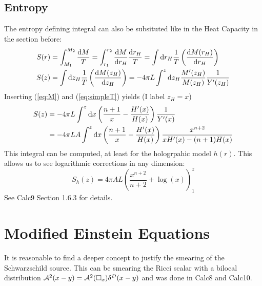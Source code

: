\documentclass[10pt,a4paper, fleqn]{article}
\begin{document}
\subsection{Entropy}
%
The entropy defining integral can also be subsituted like in the Heat Capacity in the section before:
%
\begin{subequations}
\begin{align}
S(r) &= \int^{M_2}_{M_1} \frac{\mathrm{d} M}T = \int_{r_1}^{r_2} \frac{\mathrm{d} M}{\mathrm{d} r_H} \frac {\mathrm{d} r_H}T = \int \mathrm{d} r_H \frac 1T \left( \frac{\mathrm{d} M(r_H)}{\mathrm{d} r_H} \right) \\
S(z) &= \int \mathrm{d} z_H \frac 1T \left( \frac{\mathrm{d} M(z_H)}{\mathrm{d} z_H} \right)
=  -4\pi L \int^z \mathrm{d} z_H\frac{M'(z_H)}{M(z_H)} \frac  1{Y'(z_H)} 
\end{align}
\end{subequations}
%
Inserting (\ref{eq:M}) and (\ref{eq:simpleT}) yields (I label $z_H=x$)
%
\begin{subequations}
\begin{align}
S(z) &= -4\pi L \int^z \mathrm{d} x \left( \frac {n+1}x - \frac {H'(x)}{H(x)} \right) \frac 1{Y'(x)} \\
&= -4 \pi LA \int^z \mathrm{d} x \left( \frac {n+1}x - \frac {H'(x)}{H(x)} \right)
\frac{x^{n+2}}{x H'(x) - (n+1) H(x)}  \label{eq:Sgeneric} 
\end{align}
\end{subequations}
%
This integral can be computed, at least for the hologrpahic model $h(r)$. This allows us to see logarithmic corrections in any dimension:
%
\begin{equation}
S_h(z) = 4\pi A L \left( \frac{x^{n+2}}{n+2} + \log(x) \right)^z_1
\end{equation}
%
See Calc9 Section 1.6.3 for details.

\newpage
\section{Modified Einstein Equations}
It is reasonable to find a deeper concept to justify the smearing of the Schwarzschild source. This can be smearing the Ricci scalar with a bilocal distribution ${\cal A}^2(x-y) = {\cal A}^2(\square_x) \delta^D(x-y)$ and was done in Calc8 and Calc10.
\end{document}
